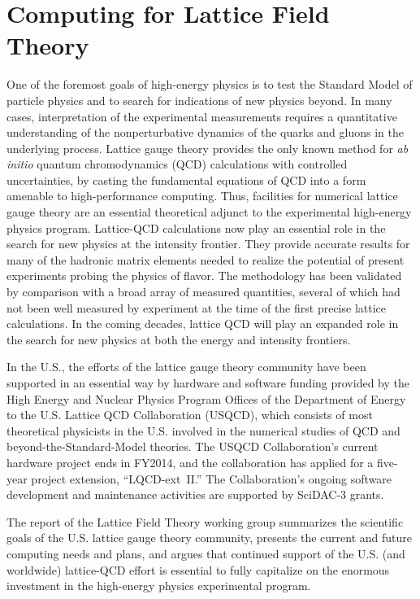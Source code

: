  
\section{Computing for Lattice Field Theory}
\label{chap:LFT}


One of the foremost goals of high-energy physics is to test the Standard Model
of particle physics and to search for indications of new physics beyond. In
many cases, interpretation of the experimental measurements requires a
quantitative understanding of the nonperturbative dynamics of the quarks and
gluons in the underlying process.  Lattice gauge theory provides the only
known method for \emph{ab initio} quantum chromodynamics (QCD) calculations
with controlled uncertainties, by casting the fundamental equations of QCD
into a form amenable to high-performance computing.  Thus, facilities for
numerical lattice gauge theory are an essential theoretical adjunct to the
experimental high-energy physics program.  Lattice-QCD calculations now play
an essential role in the search for new physics at the intensity frontier.
They provide accurate results for many of the hadronic matrix elements needed
to realize the potential of present experiments probing the physics of
flavor. The methodology has been validated by comparison with a broad array of
measured quantities, several of which had not been well measured by experiment
at the time of the first precise lattice
calculations.  In the coming decades, lattice QCD will
play an expanded role in the search for new physics at both the energy and
intensity frontiers.

In the U.S., the efforts of the lattice gauge theory community have been
supported in an essential way by hardware and software funding provided by the
High Energy and Nuclear Physics Program Offices of the Department of Energy to
the U.S. Lattice QCD Collaboration (USQCD), which consists of most theoretical
physicists in the U.S. involved in the numerical studies of QCD and
beyond-the-Standard-Model theories.  The USQCD Collaboration's current
hardware project ends in FY2014, and the collaboration has applied for a
five-year project extension, ``LQCD-ext~II.''  The Collaboration's ongoing
software development and maintenance activities are supported by SciDAC-3
grants.

The report of the Lattice Field Theory working group summarizes the scientific
goals of the U.S. lattice gauge theory community, presents the current and
future computing needs and plans, and argues that continued support of the
U.S. (and worldwide) lattice-QCD effort is essential to fully capitalize on
the enormous investment in the high-energy physics experimental program.

